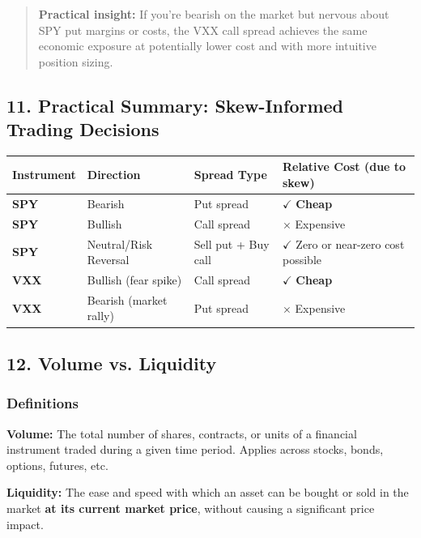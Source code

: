\documentclass[12pt,openany]{book}
\begin{document}
\begin{quote}
\textbf{Practical insight:} If you're bearish on the market but nervous about SPY put margins or costs, the VXX call spread achieves the same economic exposure at potentially lower cost and with more intuitive position sizing.
\end{quote}

\subsection{11. Practical Summary: Skew-Informed Trading Decisions}

\begin{center}
\scriptsize
\setlength{\tabcolsep}{3pt}
\begin{tabular}{|L{3.0cm}|L{3.0cm}|L{3.0cm}|L{3.0cm}|}
\hline
\textbf{Instrument} & \textbf{Direction} & \textbf{Spread Type} & \textbf{Relative Cost (due to skew)} \\
\hline
\textbf{SPY} & Bearish & Put spread & \(\checkmark\) \textbf{Cheap} \\
\hline
\textbf{SPY} & Bullish & Call spread & \(\times\) Expensive \\
\hline
\textbf{SPY} & Neutral/Risk Reversal & Sell put + Buy call & \(\checkmark\) Zero or near-zero cost possible \\
\hline
\textbf{VXX} & Bullish (fear spike) & Call spread & \(\checkmark\) \textbf{Cheap} \\
\hline
\textbf{VXX} & Bearish (market rally) & Put spread & \(\times\) Expensive \\
\hline
\end{tabular}
\end{center}

\subsection{12. Volume vs. Liquidity}

\subsubsection{Definitions}

\textbf{Volume:}
The total number of shares, contracts, or units of a financial instrument traded during a given time period. Applies across stocks, bonds, options, futures, etc.

\textbf{Liquidity:}
The ease and speed with which an asset can be bought or sold in the market \textbf{at its current market price}, without causing a significant price impact.
\end{document}
